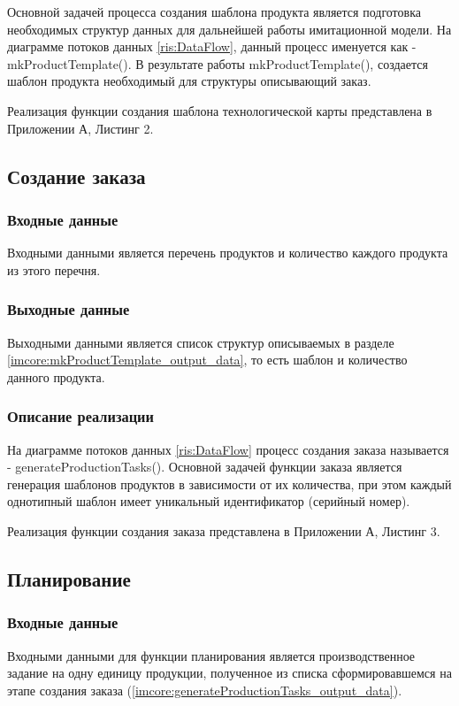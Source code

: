 Основной задачей процесса создания шаблона продукта является подготовка необходимых структур данных для дальнейшей работы имитационной модели. На диаграмме потоков данных \ref{ris:DataFlow}, данный процесс именуется как - mkProductTemplate(). В результате работы mkProductTemplate(), создается шаблон продукта необходимый для структуры описывающий заказ.

Реализация функции создания шаблона технологической карты представлена в Приложении А, Листинг 2.

\subsection{Создание заказа}

\subsubsection*{Входные данные}
Входными данными является перечень продуктов и количество каждого продукта из этого перечня.

\label{imcore:generateProductionTasks_output_data}

\subsubsection*{Выходные данные}
Выходными данными является список структур описываемых в разделе \ref{imcore:mkProductTemplate_output_data}, то есть шаблон и количество данного продукта.

\subsubsection*{Описание реализации}
На диаграмме потоков данных \ref{ris:DataFlow} процесс создания заказа называется - generateProductionTasks(). Основной задачей функции заказа является генерация шаблонов продуктов в зависимости от их количества, при этом каждый однотипный шаблон имеет уникальный идентификатор (серийный номер).

Реализация функции создания заказа представлена в Приложении А, Листинг 3.


\subsection{Планирование}

\subsubsection*{Входные данные}
Входными данными для функции планирования является производственное задание на одну единицу продукции, полученное из списка сформировавшемся на этапе создания заказа (\ref{imcore:generateProductionTasks_output_data}).

